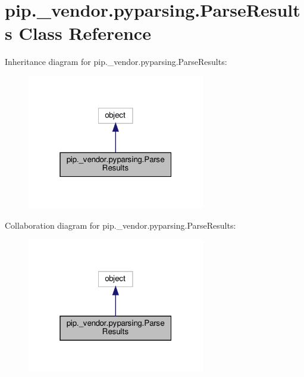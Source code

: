 \hypertarget{classpip_1_1__vendor_1_1pyparsing_1_1ParseResults}{}\section{pip.\+\_\+vendor.\+pyparsing.\+Parse\+Results Class Reference}
\label{classpip_1_1__vendor_1_1pyparsing_1_1ParseResults}


Inheritance diagram for pip.\+\_\+vendor.\+pyparsing.\+Parse\+Results\+:
\nopagebreak
\begin{figure}[H]
\begin{center}
\leavevmode
\includegraphics[width=220pt]{classpip_1_1__vendor_1_1pyparsing_1_1ParseResults__inherit__graph}
\end{center}
\end{figure}


Collaboration diagram for pip.\+\_\+vendor.\+pyparsing.\+Parse\+Results\+:
\nopagebreak
\begin{figure}[H]
\begin{center}
\leavevmode
\includegraphics[width=220pt]{classpip_1_1__vendor_1_1pyparsing_1_1ParseResults__coll__graph}
\end{center}
\end{figure}
